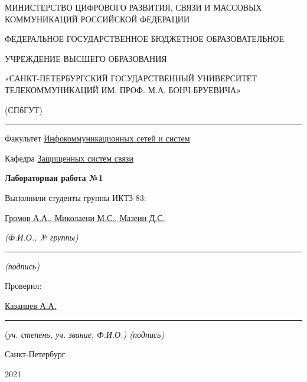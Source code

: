 \documentclass[a4paper,14pt]{extarticle}
\begin{document}
    \begin{center}
        \thispagestyle{empty}
        \begin{singlespace}
        МИНИСТЕРСТВО ЦИФРОВОГО РАЗВИТИЯ, СВЯЗИ И МАССОВЫХ КОММУНИКАЦИЙ РОССИЙСКОЙ ФЕДЕРАЦИИ

        ФЕДЕРАЛЬНОЕ ГОСУДАРСТВЕННОЕ БЮДЖЕТНОЕ ОБРАЗОВАТЕЛЬНОЕ

        УЧРЕЖДЕНИЕ ВЫСШЕГО ОБРАЗОВАНИЯ

        «САНКТ-ПЕТЕРБУРГСКИЙ ГОСУДАРСТВЕННЫЙ УНИВЕРСИТЕТ ТЕЛЕКОММУНИКАЦИЙ ИМ. ПРОФ. М.А. БОНЧ-БРУЕВИЧА»

        (СПбГУТ)
        \end{singlespace}
        \vspace{-1ex}
        \rule{\textwidth}{0.4pt}
        \vspace{-5ex}

        Факультет \underline{Инфокоммуникационных сетей и систем}

        Кафедра \underline{Защищенных систем связи}
        \vspace{10ex}

        \textbf{Лабораторная работа №1}\\
        


    \end{center}
    \vspace{4ex}
    \begin{flushright}
    \parbox{10 cm}{
    \begin{flushleft}
        Выполнили студенты группы ИКТЗ-83:

        \underline{Громов А.А., Миколаени М.С., Мазеин Д.С.} \hfill 

        \footnotesize \textit{ (Ф.И.О., № группы)} \hfill \rule[-0.85ex]{0.1\textwidth}{0.6pt}
        
        \hfill \textit{(подпись)} \normalsize

        Проверил:

        \underline{Казанцев А.А.} \hfill \rule[-0.85ex]{0.1\textwidth}{0.6pt}

        (\footnotesize \textit{уч. степень, уч. звание, Ф.И.О.) \hfill (подпись)} \normalsize

    \end{flushleft}
    }
    \end{flushright}
    \begin{center}
        \vfill
        Санкт-Петербург

        2021

    \end{center}
    \newpage
\end{document}
